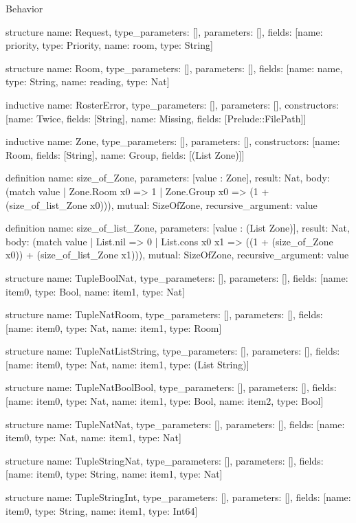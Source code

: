 \begin{lexlean}{Behavior}
\begin{semanticmodule}
structure{
  name: Request,
  type_parameters: [],
  parameters: [],
  fields: [{name: priority, type: Priority}, {name: room, type: String}]
}

structure{
  name: Room,
  type_parameters: [],
  parameters: [],
  fields: [{name: name, type: String}, {name: reading, type: Nat}]
}

inductive{
  name: RosterError,
  type_parameters: [],
  parameters: [],
  constructors: [{name: Twice, fields: [String]}, {name: Missing, fields: [Prelude::FilePath]}]
}

inductive{
  name: Zone,
  type_parameters: [],
  parameters: [],
  constructors: [{name: Room, fields: [String]}, {name: Group, fields: [(List Zone)]}]
}

definition{
  name: size_of_Zone,
  parameters: [value : Zone],
  result: Nat,
  body: (match value | Zone.Room x0 => 1 | Zone.Group x0 => (1 + (size_of_list_Zone x0))),
  mutual: SizeOfZone,
  recursive_argument: value
}

definition{
  name: size_of_list_Zone,
  parameters: [value : (List Zone)],
  result: Nat,
  body: (match value
    | List.nil => 0
    | List.cons x0 x1 => ((1 + (size_of_Zone x0)) + (size_of_list_Zone x1))),
  mutual: SizeOfZone,
  recursive_argument: value
}

structure{
  name: TupleBoolNat,
  type_parameters: [],
  parameters: [],
  fields: [{name: item0, type: Bool}, {name: item1, type: Nat}]
}

structure{
  name: TupleNatRoom,
  type_parameters: [],
  parameters: [],
  fields: [{name: item0, type: Nat}, {name: item1, type: Room}]
}

structure{
  name: TupleNatListString,
  type_parameters: [],
  parameters: [],
  fields: [{name: item0, type: Nat}, {name: item1, type: (List String)}]
}

structure{
  name: TupleNatBoolBool,
  type_parameters: [],
  parameters: [],
  fields: [{name: item0, type: Nat}, {name: item1, type: Bool}, {name: item2, type: Bool}]
}

structure{
  name: TupleNatNat,
  type_parameters: [],
  parameters: [],
  fields: [{name: item0, type: Nat}, {name: item1, type: Nat}]
}

structure{
  name: TupleStringNat,
  type_parameters: [],
  parameters: [],
  fields: [{name: item0, type: String}, {name: item1, type: Nat}]
}

structure{
  name: TupleStringInt,
  type_parameters: [],
  parameters: [],
  fields: [{name: item0, type: String}, {name: item1, type: Int64}]
}


\end{semanticmodule}
\end{lexlean}
